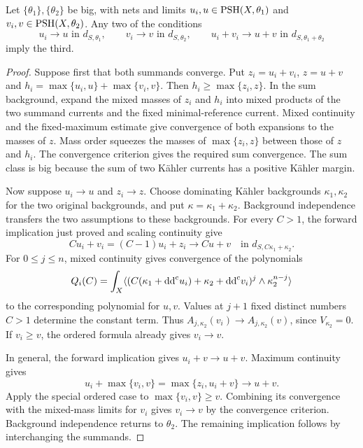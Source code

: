 \begin{theorem}\label{thm:singularity-addition-and-cancellation}
Let $\{\theta_1\},\{\theta_2\}$ be big, with nets and limits $u_i,u\in\mathrm{PSH}(X,\theta_1)$ and $v_i,v\in\mathrm{PSH}(X,\theta_2)$. Any two of the conditions
\[
 u_i\to u\text{ in }d_{S,\theta_1},\qquad
 v_i\to v\text{ in }d_{S,\theta_2},\qquad
 u_i+v_i\to u+v\text{ in }d_{S,\theta_1+\theta_2}
\]
imply the third.
\end{theorem}
\begin{proof}
Suppose first that both summands converge. Put
$z_i=u_i+v_i$, $z=u+v$ and $h_i=\max\{u_i,u\}+\max\{v_i,v\}$. Then $h_i\geq\max\{z_i,z\}$. In the sum background, expand the mixed masses of $z_i$ and $h_i$ into mixed products of the two summand currents and the fixed minimal-reference current. Mixed continuity and the fixed-maximum estimate give convergence of both expansions to the masses of $z$. Mass order squeezes the masses of $\max\{z_i,z\}$ between those of $z$ and $h_i$. The convergence criterion gives the required sum convergence. The sum class is big because the sum of two K\"ahler currents has a positive K\"ahler margin.

Now suppose $u_i\to u$ and $z_i\to z$. Choose dominating K\"ahler backgrounds $\kappa_1,\kappa_2$ for the two original backgrounds, and put $\kappa=\kappa_1+\kappa_2$. Background independence transfers the two assumptions to these backgrounds. For every $C>1$, the forward implication just proved and scaling continuity give
\[
 Cu_i+v_i=(C-1)u_i+z_i\longrightarrow Cu+v
                    \quad\text{in }d_{S,C\kappa_1+\kappa_2}.
\]
For $0\leq j\leq n$, mixed continuity gives convergence of the polynomials
\[
 Q_i(C)=\int_X\langle(C(\kappa_1+\mathrm{dd}^{\mathrm{c}} u_i)
                         +\kappa_2+\mathrm{dd}^{\mathrm{c}} v_i)^j\wedge\kappa_2^{n-j}\rangle
\]
to the corresponding polynomial for $u,v$. Values at $j+1$ fixed distinct numbers $C>1$ determine the constant term. Thus
$A_{j,\kappa_2}(v_i)\to A_{j,\kappa_2}(v)$, since $V_{\kappa_2}=0$. If $v_i\geq v$, the ordered formula already gives $v_i\to v$.

In general, the forward implication gives $u_i+v\to u+v$. Maximum continuity gives
\[
 u_i+\max\{v_i,v\}=\max\{z_i,u_i+v\}\longrightarrow u+v.
\]
Apply the special ordered case to $\max\{v_i,v\}\geq v$. Combining its convergence with the mixed-mass limits for $v_i$ gives $v_i\to v$ by the convergence criterion. Background independence returns to $\theta_2$. The remaining implication follows by interchanging the summands.
\end{proof}

